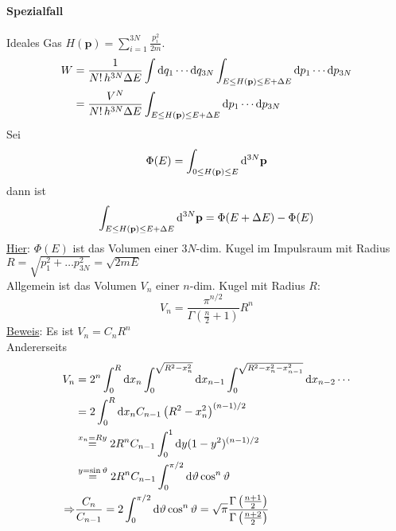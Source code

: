 \paragraph{Spezialfall} Ideales Gas $H(\textbf{p}) = \sum_{i=1}^{3N} \frac{p_i^2}{2 m}$.
\begin{equation}
    \begin{split}
        W &= \frac{1}{N! \, h^{3N} \Delta E} \int \mathrm{d} q_1 \cdots \mathrm{d} q_{3N}  \int_{E\leq H(\textbf{p})\leq E+\Delta E} \mathrm{d} p_1 \cdots \mathrm{d} p_{3N}  \\
        &= \frac{V^N}{N! \, h^{3N} \Delta E} \int_{E\leq H(\textbf{p})\leq E+\Delta E} \mathrm{d} p_1 \cdots \mathrm{d} p_{3N}
    \end{split}
\end{equation}
Sei
\begin{equation}
    \Phi(E) = \int_{0\leq H(\textbf{p})\leq E} \mathrm{d}^{3N} \textbf{p}
\end{equation}
dann ist
\begin{equation}
    \int_{E\leq H(\textbf{p})\leq E+\Delta E} \mathrm{d}^{3N} \textbf{p} = \Phi(E+\Delta E) - \Phi(E)
\end{equation}
\underline{Hier}: $\Phi(E)$ ist das Volumen einer $3N$-dim. Kugel im Impulsraum mit Radius $R = \sqrt{p_1^2 + \ldots p_{3N}^2} = \sqrt{2 m E}$ \\
Allgemein ist das Volumen $V_n$ einer $n$-dim. Kugel mit Radius $R$:
\begin{equation}
    V_n = \frac{\pi^{n/2}}{\Gamma \left( \frac{n}{2} + 1 \right)} R^n
\end{equation}
\underline{Beweis}: Es ist $V_n = C_n R^n$ \\
Andererseits
\begin{equation}
    \begin{split}
        V_n &= 2^n \int_{0}^{R} \mathrm{d} x_n \int_{0}^{\sqrt{R^2 - x_n^2}} \mathrm{d} x_{n-1} \int_{0}^{\sqrt{R^2 - x_n^2 - x_{n-1}^2}} \mathrm{d} x_{n-2} \cdots \\
        & = 2 \int_{0}^{R} \mathrm{d} x_n C_{n-1} \left( R^2 - x_n^2 \right)^{(n-1)/2} \\
        & \overset{x_n = R y}{=} 2 R^n C_{n-1} \int_{0}^{1} \mathrm{d} y (1-y^2)^{(n-1)/2} \\
        & \overset{y = \sin \vartheta}{=} 2 R^n C_{n-1} \int_0^{\pi/2} \mathrm{d} \vartheta \cos^n \vartheta \\
        \Rightarrow & \frac{C_n}{C_{n-1}} = 2 \int_0^{\pi/2} \mathrm{d} \vartheta \cos^n \vartheta = \sqrt{\pi} \frac{\Gamma \left( \frac{n+1}{2} \right)}{\Gamma \left( \frac{n+2}{2} \right) }
    \end{split}
\end{equation}
